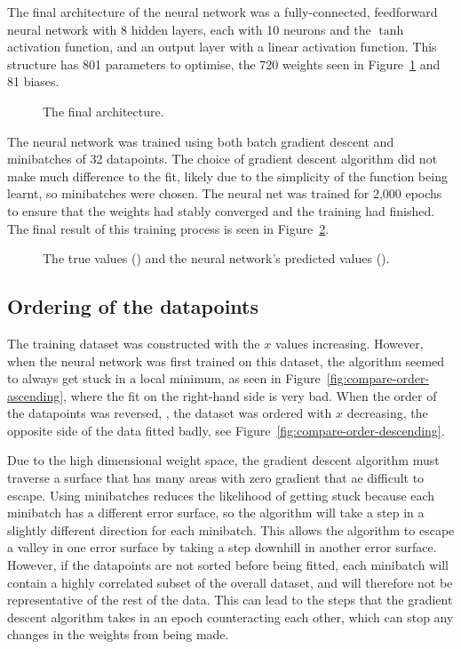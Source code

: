 The final architecture of the neural network was a fully-connected, feedforward neural network with 8 hidden layers, each with 10 neurons and the \(\tanh\) activation function, and an output layer with a linear activation function.
This structure has 801 parameters to optimise, the 720 weights seen in Figure~\ref{fig:final-ann-architecture} and 81 biases.

\begin{figure}[htbp]
	\centering
	
	\caption{The final architecture.}
	\label{fig:final-ann-architecture}
\end{figure}

The neural network was trained using both batch gradient descent and minibatches of 32 datapoints.
The choice of gradient descent algorithm did not make much difference to the fit, likely due to the simplicity of the function being learnt, so minibatches were chosen.
The neural net was trained for 2,000 epochs to ensure that the weights had stably converged and the training had finished.
The final result of this training process is seen in Figure~\ref{fig:nn-fit}.

\begin{figure}[htbp]
	\centering
	
	\caption{The true values (\truthcolour) and the neural network's predicted values (\anncolour).}
	\label{fig:nn-fit}
\end{figure}

\subsection{Ordering of the datapoints}

The training dataset was constructed with the \(x\) values increasing.
However, when the neural network was first trained on this dataset, the algorithm seemed to always get stuck in a local minimum, as seen in Figure~\ref{fig:compare-order-ascending}, where the fit on the right-hand side is very bad.
When the order of the datapoints was reversed, \ie{}, the dataset was ordered with \(x\) decreasing, the opposite side of the data fitted badly, see Figure~\ref{fig:compare-order-descending}.

Due to the high dimensional weight space, the gradient descent algorithm must traverse a surface that has many areas with zero gradient that ae difficult to escape.
Using minibatches reduces the likelihood of getting stuck because each minibatch has a different error surface, so the algorithm will take a step in a slightly different direction for each minibatch.
This allows the algorithm to escape a valley in one error surface by taking a step downhill in another error surface.
However, if the datapoints are not sorted before being fitted, each minibatch will contain a highly correlated subset of the overall dataset, and will therefore not be representative of the rest of the data.
This can lead to the steps that the gradient descent algorithm takes in an epoch counteracting each other, which can stop any changes in the weights from being made.

